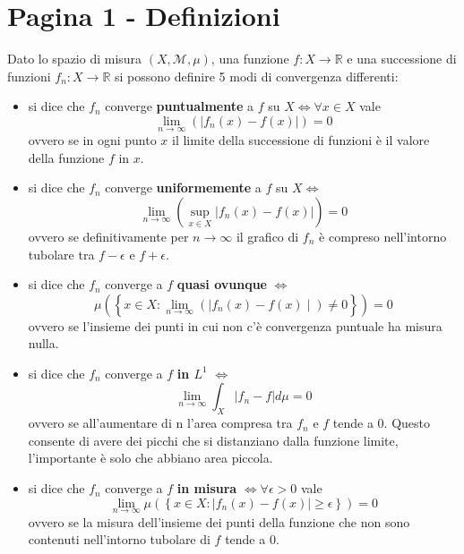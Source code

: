 \documentclass[12pt,a4paper]{report}
\begin{document}
\section*{Pagina 1 - Definizioni}
Dato lo spazio di misura \(\left(X, \mathcal{M}, \mu \right) \), una funzione \(f : X \rightarrow \mathbb{R}\) e una successione di funzioni \(f_{n} : X \rightarrow \mathbb{R} \) si possono definire 5 modi di convergenza differenti:

\begin{itemize}
 \item si dice che \(f_{n}\) converge \textbf{puntualmente} a \(f\) su \(X \iff \forall x \in X\) vale
\[\lim_{n \to \infty } \left( {|f_{n}\left(x \right) - f\left(x\right) | } \right) =0 \]
ovvero se in ogni punto \(x\) il limite della successione di funzioni è il valore della funzione \(f\) in \(x\).

 \item si dice che \(f_{n}\) converge \textbf{uniformemente} a \(f\) su \(X \iff \)
\[ \lim_{n \rightarrow \infty } \left( \sup_{x \in X}{|f_{n}\left(x \right) - f\left(x\right) | } \right) =0 \]
ovvero se definitivamente per \(n\to\infty \) il grafico di \(f_{n}\) è compreso nell'intorno tubolare tra \(f - \epsilon\) \quad e \quad \(f+\epsilon\).

 \item si dice che \(f_{n}\) converge a \(f\) \textbf{quasi ovunque} \(\iff \)
\[\mu \left( \left\lbrace x \in X : \lim_{n \to \infty } \left( {\mid f_{n}\left(x \right) - f\left(x\right)\mid } \right) \neq 0 \right\rbrace \right) = 0 \]
ovvero se l'insieme dei punti in cui non c'è convergenza puntuale ha misura nulla.

 \item si dice che \(f_{n}\) converge a \(f\) \textbf{in \(L^{1}\)} \(\iff\)
\[ \lim_{n \rightarrow \infty} \int_{X}{ |f_{n} - f | d\mu = 0} \]
ovvero se all'aumentare di n l'area compresa tra \(f_{n}\) e \(f\) tende a 0. Questo consente di avere dei picchi che si distanziano dalla funzione limite, l'importante è solo che abbiano area piccola.

 \item si dice che \(f_{n}\) converge a \(f\) \textbf{in misura} \(\iff \forall \epsilon > 0 \) vale
\[ \lim_{n \rightarrow \infty}{ \mu \left( \left\lbrace x \in X : | f_{n} \left( x \right) - f \left( x \right) | \geq \epsilon \right\rbrace \right)} = 0 \]
ovvero se la misura dell'insieme dei punti della funzione che non sono contenuti nell'intorno tubolare di \(f\) tende a 0.
\end{itemize}
\end{document}
